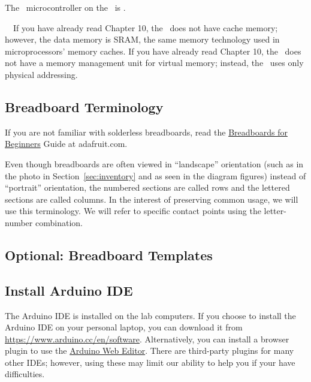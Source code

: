 The \microcontroller\ microcontroller on the \developmentboard\ is \microcontrollerprocessorandmemory.
\microcontrollerintegertiming\
\microcontrollerdivisionandfloats\

\memorymodeldescription\
\pipelinedescription\
If you have already read Chapter 10, the \microcontroller\ does not have cache memory;
however, the data memory is SRAM, the same memory technology used in microprocessors' memory caches.
If you have already read Chapter 10, the \microcontroller\ does not have a memory management unit for virtual memory;
instead, the \microcontroller\ uses only physical addressing.

\subsection{Breadboard Terminology}

    If you are not familiar with solderless breadboards, read the
    \href{https://learn.adafruit.com/breadboards-for-beginners?view=all}{Breadboards for Beginners} Guide at adafruit.com.

    Even though breadboards are often viewed in ``landscape'' orientation (such as in the photo in Section~\ref{sec:inventory} and as seen in the diagram figures) instead of ``portrait'' orientation, the numbered sections are called rows and the lettered sections are called columns.
    In the interest of preserving common usage, we will use this terminology.
    We will refer to specific contact points using the letter-number combination.

\subsection{Optional: Breadboard Templates}                    



\subsection{Install Arduino IDE}

    The Arduino IDE is installed on the lab computers.
    If you choose to install the Arduino IDE on your personal laptop, you can download it from
    \url{https://www.arduino.cc/en/software}.
    Alternatively, you can install a browser plugin to use the
    \href{https://create.arduino.cc/projecthub/Arduino_Genuino/getting-started-with-arduino-web-editor-on-various-platforms-4b3e4a}{Arduino Web Editor}.
    There are third-party plugins for many other IDEs; however, using these may limit our ability to help you if your have difficulties.

